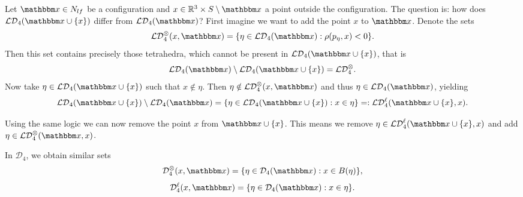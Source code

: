 \begin{remark}
	Let $\x\in N_{lf}$ be a configuration and $x\in\Rt \times S \setminus \x$ a point outside the configuration. The question is: how does $\mathcal {LD}_4(\x \cup \{x\})$ differ from $\mathcal {LD}_4(\x)$?
	First imagine we want to add the point $x$ to $\x$. Denote the sets 
	$$\mathcal {LD}_4^\otimes(x,\x) = \{\eta \in \mathcal {LD}_4(\x): \rho(p_\eta,x) < 0\}.$$
	Then this set contains precisely those tetrahedra, which cannot be present in $\mathcal {LD}_4(\x \cup \{x\})$, that is
	$$ \mathcal {LD}_4 (\x) \setminus \mathcal {LD}_4(\x \cup \{x\}) = \mathcal {LD}_4^\otimes.$$
	Now take $\eta \in \mathcal {LD}_4(\x \cup \{x\})$ such that $x \notin \eta$. Then $\eta \notin \mathcal {LD}_4^\otimes(x,\x)$ and thus $\eta \in \mathcal {LD}_4(\x)$, yielding
	$$\mathcal {LD}_4 (\x \cup \{x\}) \setminus \mathcal {LD}_4(\x) = \{ \eta \in \mathcal {LD}_4(\x\cup\{x\}): x \in \eta\} =: \mathcal {LD}_4^\ell(\x \cup \{x\},x).$$

	Using the same logic we can now remove the point $x$ from $\x \cup \{x\}$. This means we remove $\eta \in \mathcal {LD}_4^\ell(\x\cup\{x\},x)$ and add $\eta \in \mathcal {LD}_4^\otimes(\x,x)$.

	In $\mathcal D_4$, we obtain similar sets
	$$\mathcal D_4^\otimes(x,\x) = \{\eta \in \mathcal D_4(\x): x \in B(\eta)\},$$
	$$\mathcal D_4^\ell(x,\x) = \{\eta \in \mathcal D_4(\x): x\in \eta \}.$$
\end{remark}


